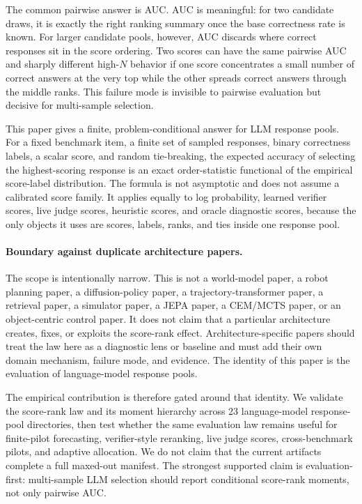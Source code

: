 \documentclass{article}
\begin{document}
The common pairwise answer is AUC. AUC is meaningful: for two candidate draws,
it is exactly the right ranking summary once the base correctness rate is
known. For larger candidate pools, however, AUC discards where correct
responses sit in the score ordering. Two scores can have the same pairwise AUC
and sharply different high-$N$ behavior if one score concentrates a small
number of correct answers at the very top while the other spreads correct
answers through the middle ranks. This failure mode is invisible to pairwise
evaluation but decisive for multi-sample selection.

This paper gives a finite, problem-conditional answer for LLM response pools.
For a fixed benchmark item, a finite set of sampled responses, binary
correctness labels, a scalar score, and random tie-breaking, the expected
accuracy of selecting the highest-scoring response is an exact
order-statistic functional of the empirical score-label distribution. The
formula is not asymptotic and does not assume a calibrated score family. It
applies equally to log probability, learned verifier scores, live judge
scores, heuristic scores, and oracle diagnostic scores, because the only
objects it uses are scores, labels, ranks, and ties inside one response pool.

\paragraph{Boundary against duplicate architecture papers.}
The scope is intentionally narrow. This is not a world-model paper, a robot
planning paper, a diffusion-policy paper, a trajectory-transformer paper, a
retrieval paper, a simulator paper, a JEPA paper, a CEM/MCTS paper, or an
object-centric control paper. It does not claim that a particular architecture
creates, fixes, or exploits the score-rank effect. Architecture-specific
papers should treat the law here as a diagnostic lens or baseline and must add
their own domain mechanism, failure mode, and evidence. The identity of this
paper is the evaluation of language-model response pools.

The empirical contribution is therefore gated around that identity. We
validate the score-rank law and its moment hierarchy across 23 language-model
response-pool directories, then test whether the same evaluation law remains
useful for finite-pilot forecasting, verifier-style reranking, live judge
scores, cross-benchmark pilots, and adaptive allocation. We do not claim that
the current artifacts complete a full maxed-out manifest. The strongest
supported claim is evaluation-first: multi-sample LLM selection should report
conditional score-rank moments, not only pairwise AUC.
\end{document}
